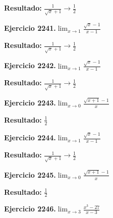 \documentclass[10pt,a4paper]{article}
\begin{document}
\begin{solbox}
\textbf{Resultado:} \(\displaystyle \frac{1}{\sqrt{x}+1} \to \frac{1}{2}\)
\end{solbox}

\begin{ejbox}
\textbf{Ejercicio 2241.}\quad $\lim_{x\to 1} \frac{\sqrt{x}-1}{x-1}$
\end{ejbox}

\begin{solbox}
\textbf{Resultado:} \(\displaystyle \frac{1}{\sqrt{x}+1} \to \frac{1}{2}\)
\end{solbox}

\begin{ejbox}
\textbf{Ejercicio 2242.}\quad $\lim_{x\to 1} \frac{\sqrt{x}-1}{x-1}$
\end{ejbox}

\begin{solbox}
\textbf{Resultado:} \(\displaystyle \frac{1}{\sqrt{x}+1} \to \frac{1}{2}\)
\end{solbox}

\newpage
\begin{ejbox}
\textbf{Ejercicio 2243.}\quad $\lim_{x\to 0} \frac{\sqrt{x+1}-1}{x}$
\end{ejbox}

\begin{solbox}
\textbf{Resultado:} \(\displaystyle \frac{1}{2}\)
\end{solbox}

\begin{ejbox}
\textbf{Ejercicio 2244.}\quad $\lim_{x\to 1} \frac{\sqrt{x}-1}{x-1}$
\end{ejbox}

\begin{solbox}
\textbf{Resultado:} \(\displaystyle \frac{1}{\sqrt{x}+1} \to \frac{1}{2}\)
\end{solbox}

\begin{ejbox}
\textbf{Ejercicio 2245.}\quad $\lim_{x\to 0} \frac{\sqrt{x+1}-1}{x}$
\end{ejbox}

\begin{solbox}
\textbf{Resultado:} \(\displaystyle \frac{1}{2}\)
\end{solbox}

\newpage
\begin{ejbox}
\textbf{Ejercicio 2246.}\quad $\lim_{x\to 3} \frac{x^3-27}{x-3}$
\end{ejbox}
\end{document}
